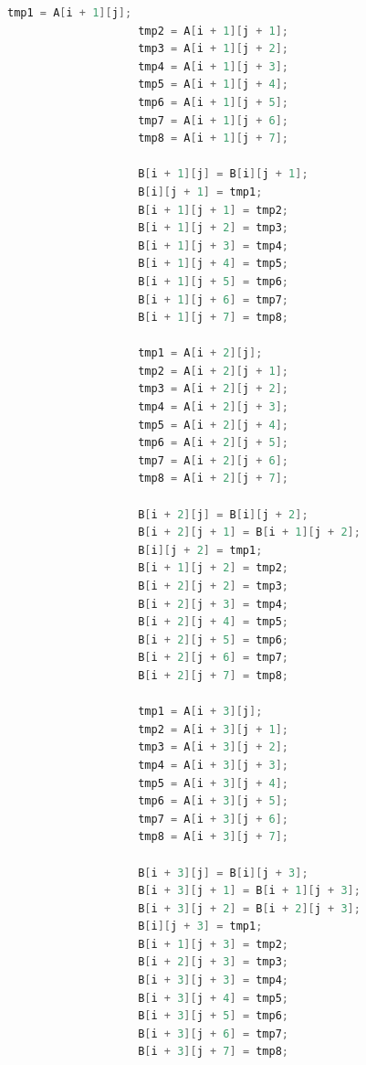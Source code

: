 \documentclass{article}
\begin{document}
\begin{lstlisting}[language=c++, caption={trans.c}, label={cd:2}]
                    tmp1 = A[i + 1][j];
                    tmp2 = A[i + 1][j + 1];
                    tmp3 = A[i + 1][j + 2];
                    tmp4 = A[i + 1][j + 3];
                    tmp5 = A[i + 1][j + 4];
                    tmp6 = A[i + 1][j + 5];
                    tmp7 = A[i + 1][j + 6];
                    tmp8 = A[i + 1][j + 7];

                    B[i + 1][j] = B[i][j + 1];
                    B[i][j + 1] = tmp1;
                    B[i + 1][j + 1] = tmp2;
                    B[i + 1][j + 2] = tmp3;
                    B[i + 1][j + 3] = tmp4;
                    B[i + 1][j + 4] = tmp5;
                    B[i + 1][j + 5] = tmp6;
                    B[i + 1][j + 6] = tmp7;
                    B[i + 1][j + 7] = tmp8;

                    tmp1 = A[i + 2][j];
                    tmp2 = A[i + 2][j + 1];
                    tmp3 = A[i + 2][j + 2];
                    tmp4 = A[i + 2][j + 3];
                    tmp5 = A[i + 2][j + 4];
                    tmp6 = A[i + 2][j + 5];
                    tmp7 = A[i + 2][j + 6];
                    tmp8 = A[i + 2][j + 7];

                    B[i + 2][j] = B[i][j + 2];
                    B[i + 2][j + 1] = B[i + 1][j + 2];
                    B[i][j + 2] = tmp1;
                    B[i + 1][j + 2] = tmp2;
                    B[i + 2][j + 2] = tmp3;
                    B[i + 2][j + 3] = tmp4;
                    B[i + 2][j + 4] = tmp5;
                    B[i + 2][j + 5] = tmp6;
                    B[i + 2][j + 6] = tmp7;
                    B[i + 2][j + 7] = tmp8;

                    tmp1 = A[i + 3][j];
                    tmp2 = A[i + 3][j + 1];
                    tmp3 = A[i + 3][j + 2];
                    tmp4 = A[i + 3][j + 3];
                    tmp5 = A[i + 3][j + 4];
                    tmp6 = A[i + 3][j + 5];
                    tmp7 = A[i + 3][j + 6];
                    tmp8 = A[i + 3][j + 7];

                    B[i + 3][j] = B[i][j + 3];
                    B[i + 3][j + 1] = B[i + 1][j + 3];
                    B[i + 3][j + 2] = B[i + 2][j + 3];
                    B[i][j + 3] = tmp1;
                    B[i + 1][j + 3] = tmp2;
                    B[i + 2][j + 3] = tmp3;
                    B[i + 3][j + 3] = tmp4;
                    B[i + 3][j + 4] = tmp5;
                    B[i + 3][j + 5] = tmp6;
                    B[i + 3][j + 6] = tmp7;
                    B[i + 3][j + 7] = tmp8;


\end{lstlisting}
\end{document}
